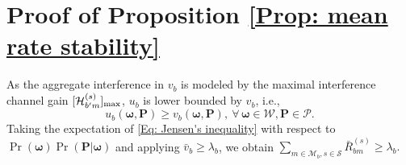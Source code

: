 \documentclass[conference]{IEEEtran}
\begin{document}
\section{Proof of Proposition \ref{Prop: mean rate stability}}
\label{Lem: mean rate stability}
As the aggregate interference in $v_b$ is modeled by the maximal interference channel gain $[\mathcal{H}_{b'm}^{(s)}]_{\rm max}$, $u_b$ is lower bounded by $v_b$, i.e.,
%
\begin{equation}\label{Eq: Jensen's inequality}
u_{b}(\boldsymbol{\omega},\mathbf{P})\geq v_{b}(\boldsymbol{\omega},\mathbf{P}),~\forall\,\boldsymbol{\omega}\in\mathcal{W},\mathbf{P}\in\mathcal{P}.
\end{equation}
%
%
%
Taking the expectation of \eqref{Eq: Jensen's inequality} with respect to $\Pr(  \boldsymbol{\omega})\Pr(\mathbf{P}|  \boldsymbol{\omega})$ and applying $\bar{v}_b\geq \lambda_{b}$,
we obtain
%
%
$ \sum_{m\in\mathcal{M}_b,s\in\mathcal{S}}\bar{R}_{bm}^{(s)}
%
%
\geq\lambda_{b}.$

%
%
%
\end{document}
